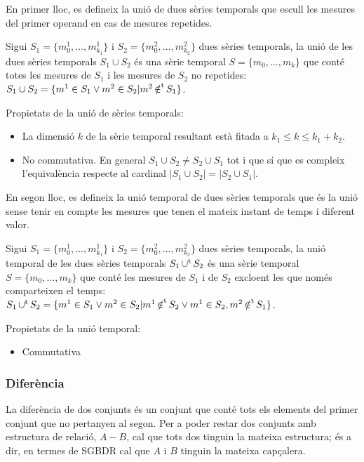 En primer lloc, es defineix la unió de dues sèries temporals que
escull les mesures del primer operand en cas de mesures repetides.
\begin{definition}[unió]
  Sigui $S_1=\{m_0^1, \dotsc, m_{k_1}^1\}$ i $S_2=\{m_0^2, \dotsc,
  m_{k_2}^2\}$ dues sèries temporals, la unió de les dues
  sèries temporals $S_1 \cup S_2$ és una sèrie temporal $S=\{m_0,
  \dotsc, m_k\}$ que conté totes les mesures de $S_1$ i les mesures de
  $S_2$ no repetides: $S_1 \cup S_2 = \{m^1 \in S_1 \vee m^2 \in S_2
  | m^2 \operatorname*{\notin^t} S_1 \}$.
\end{definition}

Propietats de la unió de sèries temporals:
\begin{itemize}
\item La dimensió $k$ de la sèrie temporal resultant està fitada a
  $k_1 \leq k \leq k_1 + k_2$. 
\item No commutativa. En general
  $S_1\cup S_2 \neq S_2\cup S_1$ tot i que sí que es compleix
  l'equivalència respecte al cardinal $|S_1 \cup S_2| = |S_2\cup S_1|$.
\end{itemize}

En segon lloc, es defineix la unió temporal de dues sèries temporals
que és la unió sense tenir en compte les mesures que tenen el mateix
instant de temps i diferent valor.
\begin{definition}
  Sigui $S_1=\{m_0^1, \dotsc, m_{k_1}^1\}$ i $S_2=\{m_0^2, \dotsc,
  m_{k_2}^2\}$ dues sèries temporals, la unió temporal de les dues
  sèries temporals $S_1 \operatorname*{\cup^t} S_2$ és una sèrie temporal $S=\{m_0,
  \dotsc, m_k\}$ que conté les mesures de $S_1$ i de $S_2$ excloent
  les que només comparteixen el temps: $S_1 \operatorname*{\cup^t} S_2 = \{ m^1 \in S_1
  \vee m^2 \in S_2 | m^1 \operatorname*{\notin^t} S_2 \vee m^1 \in S_2, m^2 \operatorname*{\notin^t}
  S_1 \}$.
\end{definition}


Propietats de la unió temporal:
\begin{itemize}
\item Commutativa
\end{itemize}



\subsubsection{Diferència}

La diferència de dos conjunts és un conjunt que conté tots els
elements del primer conjunt que no pertanyen al segon.  Per a poder
restar dos conjunts amb estructura de relació, $A - B$, cal que
tots dos tinguin la mateixa estructura; és a dir, en termes de SGBDR
cal que $A$ i $B$ tinguin la mateixa capçalera.

